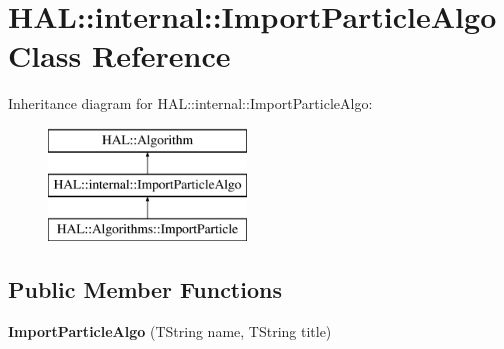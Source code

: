 \hypertarget{class_h_a_l_1_1internal_1_1_import_particle_algo}{\section{H\-A\-L\-:\-:internal\-:\-:Import\-Particle\-Algo Class Reference}
\label{class_h_a_l_1_1internal_1_1_import_particle_algo}
}
Inheritance diagram for H\-A\-L\-:\-:internal\-:\-:Import\-Particle\-Algo\-:\begin{figure}[H]
\begin{center}
\leavevmode
\includegraphics[height=3.000000cm]{class_h_a_l_1_1internal_1_1_import_particle_algo}
\end{center}
\end{figure}
\subsection*{Public Member Functions}
\begin{DoxyCompactItemize}
\item 
\hypertarget{class_h_a_l_1_1internal_1_1_import_particle_algo_a9572fe7f285d85de63b53fc4c732d1e5}{{\bfseries Import\-Particle\-Algo} (T\-String name, T\-String title)}\label{class_h_a_l_1_1internal_1_1_import_particle_algo_a9572fe7f285d85de63b53fc4c732d1e5}

\end{DoxyCompactItemize}
